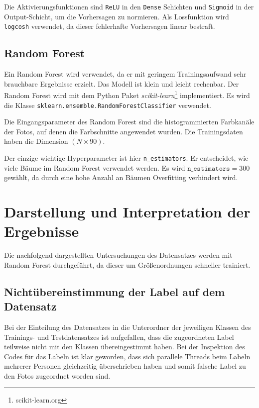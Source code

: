 Die Aktivierungsfunktionen sind \texttt{ReLU} in den \texttt{Dense}
Schichten und \texttt{Sigmoid} in der Output-Schicht, um die Vorhersagen
zu normieren. Als Lossfunktion wird \texttt{logcosh} verwendet, da
dieser fehlerhafte Vorhersagen linear bestraft.

\hypertarget{random-forest}{%
\subsection{Random Forest}\label{random-forest}}

Ein Random Forest wird verwendet, da er mit geringem Trainingsaufwand
sehr brauchbare Ergebnisse erzielt. Das Modell ist klein und leicht
rechenbar. Der Random Forest wird mit dem Python Paket
\emph{scikit-learn}\footnote{scikit-learn.org} implementiert. Es wird
die Klasse \linebreak\texttt{sklearn.ensemble.RandomForestClassifier} verwendet.

Die Eingangsparameter des Random Forest sind die histogrammierten
Farbkanäle der Fotos, auf denen die Farbschnitte angewendet wurden. Die
Trainingsdaten haben die Dimension $(N \times 90)$.

Der einzige wichtige Hyperparameter ist hier \texttt{n\_estimators}. Er
entscheidet, wie viele Bäume im Random Forest verwendet werden. Es wird
$\texttt{n\_estimators} = 300$ gewählt, da durch eine hohe Anzahl an
Bäumen Overfitting verhindert wird.

\hypertarget{darstellung-und-interpretation-der-ergebnisse}{%
\section{Darstellung und Interpretation der
Ergebnisse}\label{darstellung-und-interpretation-der-ergebnisse}}

Die nachfolgend dargestellten Untersuchungen des Datensatzes werden mit
Random Forest durchgeführt, da dieser um Größenordnungen schneller
trainiert.

\hypertarget{nichtuxfcbereinstimmung-der-label-auf-dem-datensatz}{%
\subsection{Nichtübereinstimmung der Label auf dem
Datensatz}\label{nichtuxfcbereinstimmung-der-label-auf-dem-datensatz}}

Bei der Einteilung des Datensatzes in die Unterordner der jeweiligen
Klassen des Trainings- und Testdatensatzes ist aufgefallen, dass die
zugeordneten Label teilweise nicht mit den Klassen übereingestimmt
haben. Bei der Inspektion des Codes für das Labeln ist klar geworden,
dass sich parallele Threads beim Labeln mehrerer Personen gleichzeitig
überschrieben haben und somit falsche Label zu den Fotos zugeordnet
worden sind.

